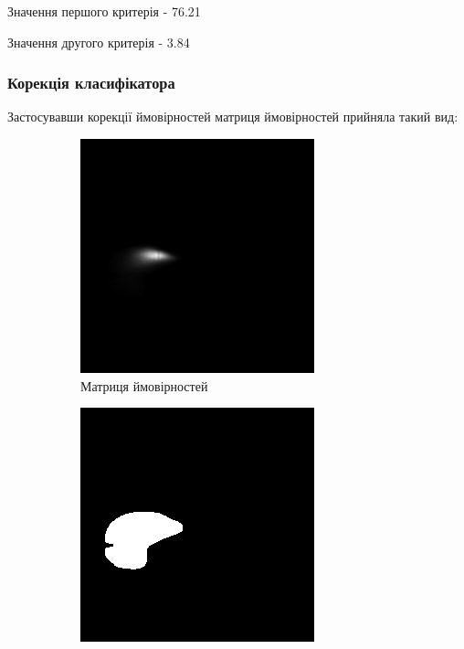 Значення першого критерія - 76.21%

Значення другого критерія - 3.84%

\subsubsection{Корекція класифікатора}

Застосувавши корекції ймовірностей матриця ймовірностей прийняла такий вид:
\begin{figure}[H]
	\centering
	\begin{subfigure}[b]{0.45\textwidth}
		\includegraphics[width=\textwidth]{practise/img/b_end}
		\caption{Матриця ймовірностей}
		\label{fig:b_end}
	\end{subfigure}
	\hfill
	\begin{subfigure}[b]{0.45\textwidth}
		\includegraphics[width=\textwidth]{practise/img/b_end_gen}

\end{subfigure}
\end{figure}
